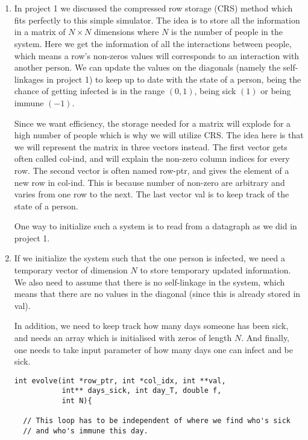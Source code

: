 \documentclass{article}
\begin{document}
\section{}
\begin{enumerate}[label=(\alph*)]
\item
In project 1 we discussed the compressed row storage (CRS) method which fits perfectly to this simple simulator. The idea is to store all the information in a matrix of $N\times N$ dimensions where $N$ is the number of people in the system. Here we get the information of all the interactions between people, which means a row's non-zeros values will corresponds to an interaction with another person. We can update the values on the diagonals (namely the self-linkages in project 1) to keep up to date with the state of a person, being the chance of getting infected is in the range $(0,1)$, being sick $(1)$ or being immune $(-1)$.

Since we want efficiency, the storage needed for a matrix will explode for a high number of people which is why we will utilize CRS. The idea here is that we will represent the matrix in three vectors instead. The first vector gets often called col-ind, and will explain the non-zero column indices for every row. The second vector is often named row-ptr, and gives the element of a new row in col-ind. This is because number of non-zero are arbitrary and varies from one row to the next. The last vector val is to keep track of the state of a person.

One way to initialize such a system is to read from a datagraph as we did in project 1.

\item
If we initialize the system such that the one person is infected, we need a temporary vector of dimension $N$ to store temporary updated information. We also need to assume that there is no self-linkage in the system, which means that there are no values in the diagonal (since this is already stored in val).

In addition, we need to keep track how many days someone has been sick, and needs an array which is initialised with zeros of length $N$. And finally, one needs to take input parameter of how many days one can infect and be sick.


\begin{lstlisting}
int evolve(int *row_ptr, int *col_idx, int **val,
           int** days_sick, int day_T, double f,
           int N){

  // This loop has to be independent of where we find who's sick
  // and who's immune this day.


\end{lstlisting}
\end{enumerate}
\end{document}
